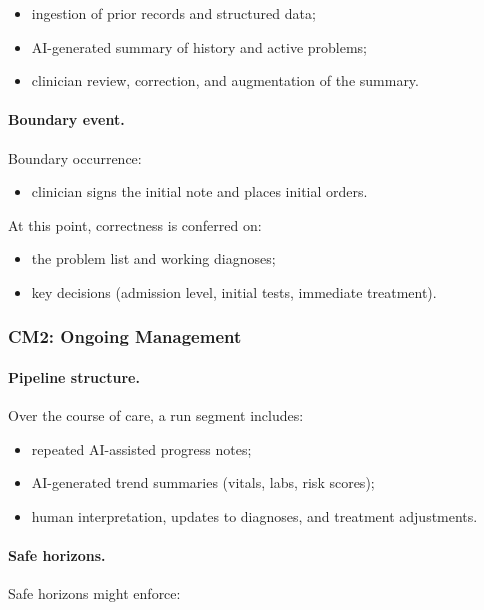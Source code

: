 \begin{itemize}
  \item ingestion of prior records and structured data;
  \item AI-generated summary of history and active problems;
  \item clinician review, correction, and augmentation of the summary.
\end{itemize}

\paragraph{Boundary event.}
Boundary occurrence:

\begin{itemize}
  \item clinician signs the initial note and places initial orders.
\end{itemize}

At this point, correctness is conferred on:

\begin{itemize}
  \item the problem list and working diagnoses;
  \item key decisions (admission level, initial tests, immediate treatment).
\end{itemize}

\subsubsection*{CM2: Ongoing Management}

\paragraph{Pipeline structure.}
Over the course of care, a run segment includes:

\begin{itemize}
  \item repeated AI-assisted progress notes;
  \item AI-generated trend summaries (vitals, labs, risk scores);
  \item human interpretation, updates to diagnoses, and treatment adjustments.
\end{itemize}

\paragraph{Safe horizons.}
Safe horizons might enforce:

